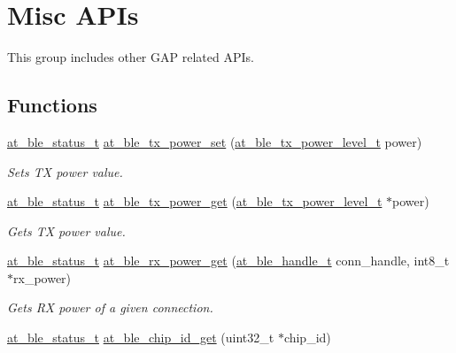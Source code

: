 \hypertarget{group__gap__misc__group}{}\section{Misc A\+P\+Is}
\label{group__gap__misc__group}


This group includes other G\+AP related A\+P\+Is.  


\subsection*{Functions}
\begin{DoxyCompactItemize}
\item 
\mbox{\hyperlink{group__error__codes__group_ga3b1db9b95feb157b3c188ca27fe76988}{at\+\_\+ble\+\_\+status\+\_\+t}} \mbox{\hyperlink{group__gap__misc__group_ga157b800cc43266a7c8afb90df9443796}{at\+\_\+ble\+\_\+tx\+\_\+power\+\_\+set}} (\mbox{\hyperlink{at__ble__api_8h_ad386e054a6ad3e11fc538a0796061404}{at\+\_\+ble\+\_\+tx\+\_\+power\+\_\+level\+\_\+t}} power)
\begin{DoxyCompactList}\small\item\em Sets TX power value. \end{DoxyCompactList}\item 
\mbox{\hyperlink{group__error__codes__group_ga3b1db9b95feb157b3c188ca27fe76988}{at\+\_\+ble\+\_\+status\+\_\+t}} \mbox{\hyperlink{group__gap__misc__group_gada18b50c32fb96be593fa15c245dc5c9}{at\+\_\+ble\+\_\+tx\+\_\+power\+\_\+get}} (\mbox{\hyperlink{at__ble__api_8h_ad386e054a6ad3e11fc538a0796061404}{at\+\_\+ble\+\_\+tx\+\_\+power\+\_\+level\+\_\+t}} $\ast$power)
\begin{DoxyCompactList}\small\item\em Gets TX power value. \end{DoxyCompactList}\item 
\mbox{\hyperlink{group__error__codes__group_ga3b1db9b95feb157b3c188ca27fe76988}{at\+\_\+ble\+\_\+status\+\_\+t}} \mbox{\hyperlink{group__gap__misc__group_gad0b3d4bdff9b2778397f2fe65fc5efa1}{at\+\_\+ble\+\_\+rx\+\_\+power\+\_\+get}} (\mbox{\hyperlink{at__ble__api_8h_abd23646d0c662860741f787efc8456f2}{at\+\_\+ble\+\_\+handle\+\_\+t}} conn\+\_\+handle, int8\+\_\+t $\ast$rx\+\_\+power)
\begin{DoxyCompactList}\small\item\em Gets RX power of a given connection. \end{DoxyCompactList}\item 
\mbox{\hyperlink{group__error__codes__group_ga3b1db9b95feb157b3c188ca27fe76988}{at\+\_\+ble\+\_\+status\+\_\+t}} \mbox{\hyperlink{group__gap__misc__group_ga88911a96609744ebd24b3b00edfb2a06}{at\+\_\+ble\+\_\+chip\+\_\+id\+\_\+get}} (uint32\+\_\+t $\ast$chip\+\_\+id)

\end{DoxyCompactItemize}
